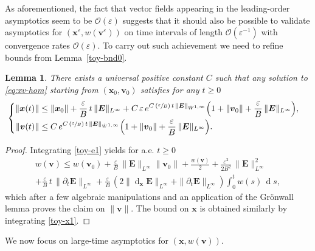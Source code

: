 \documentclass[JEP,XML,SOM,Unicode]{cedram}
\let\mathcal\mathscr
\newenvironment{splitcases}
{\begin{cases}\begin{aligned}}
{\end{aligned}\end{cases}}
\newcommand{\Psfrac}[2]{(\sfrac{#1}{#2})}
\let\eps\varepsilon
\let\d\partial
\DeclareMathOperator\dD{d}\let\dd\dD
\theoremstyle{plain}
\newtheorem{lemma}[theorem]{Lemma}
\theoremstyle{definition}
\newcommand{\bl}{\begin{lemma}}
\newcommand{\el}{\end{lemma}}
\newcommand\bE{{\boldsymbol E}}
\newcommand\bfv{{\boldsymbol v}}
\newcommand\bfx{{\boldsymbol x}}
\newcommand\cO{{\mathcal O}}
\let\e w
\begin{document}
As aforementioned, the fact that vector fields appearing in the leading-order asymptotics seem to be $\cO(\eps)$ suggests that it should also be possible to validate asymptotics for $(\bfx^\eps,\e(\bfv^\eps))$ on time intervals of length $\cO(\eps^{-1})$ with convergence rates $\cO(\eps)$. To carry out such achievement we need to refine bounds from Lemma~\ref{toy-bnd0}.

\bl
\label{toy-bnd-long}
There exists a universal positive constant $C$ such that any solution to \eqref{eq:xv-hom} starting from $(\bfx_0,\bfv_0)$ satisfies for any $t\geq0$
\[
\begin{splitcases}
\|\bfx(t)\|&\leq \|\bfx_0\|
+\frac{\eps}{B}\,t\,\|\bE\|_{L^\infty}
+C\,\eps\,e^{C\,\Psfrac{\eps}{B}\,t\,\|\bE\|_{\dot{W}^{1,\infty}}}
\Bigl(1+\|\bfv_0\|+\frac{\eps}{B}\,\|\bE\|_{L^\infty}\Bigr),
\\
\|\bfv(t)\|&\leq C\,e^{C\,\Psfrac{\eps}{B}\,t\,\|\bE\|_{\dot{W}^{1,\infty}}}
\Bigl(1+\|\bfv_0\|+\frac{\eps}{B}\,\|\bE\|_{L^\infty}\Bigr).
\end{splitcases}
\]
\el
\begin{proof}
Integrating \eqref{toy-e1} yields for a.e. $t\geq0$
\begin{multline*}
\e(\bfv)\leq \e(\bfv_0) +\frac{\eps}{B}\,\|\bE\|_{L^\infty}\|\bfv_0\|
+\frac{\e(\bfv)}{2}+\frac{\eps^2}{2B^2}\,\|\bE\|_{L^\infty}^2\\[-5pt]
+\frac{\eps}{B}\,t\,\|\d_t\bE\|_{L^\infty}
+\frac{\eps}{B}\,(2\|\dD_\bfx\bE\|_{L^\infty}+\|\d_t\bE\|_{L^\infty})\int_0^t
\e(s)\,\dD s,
\end{multline*}
which after a few algebraic manipulations and an application of the Grönwall lemma proves the claim on $\|\bfv\|$. The bound on $\bfx$ is obtained similarly by integrating \eqref{toy-x1}.
\end{proof}

We now focus on large-time asymptotics for $(\bfx,\e(\bfv))$.
\end{document}

